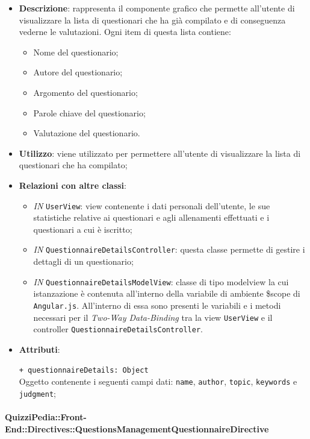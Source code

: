 \begin{itemize}
	\item \textbf{Descrizione}: rappresenta il componente grafico che permette all'utente di visualizzare la lista di questionari che ha già compilato e di conseguenza vederne le valutazioni. Ogni item di questa lista contiene:
	\begin{itemize}
		\item Nome del questionario;
		\item Autore del questionario;
		\item Argomento del questionario;
		\item Parole chiave del questionario;
		\item Valutazione del questionario.
	\end{itemize}
	\item \textbf{Utilizzo}: viene utilizzato per permettere all'utente di visualizzare la lista di questionari che ha compilato;
	\item \textbf{Relazioni con altre classi}: 
	\begin{itemize}
		\item \textit{IN} \texttt{UserView}: view contenente i dati personali dell'utente, le sue statistiche relative ai questionari e agli allenamenti effettuati e i questionari a cui è iscritto;
		\item \textit{IN} \texttt{QuestionnaireDetailsController}: questa classe permette di gestire i dettagli di un questionario;
		\item \textit{IN} \texttt{QuestionnaireDetailsModelView}: classe di tipo modelview la cui istanzazione è contenuta all'interno della variabile di ambiente \$scope di \texttt{Angular.js}. All'interno di essa sono presenti le variabili e i metodi necessari per il \textit{Two-Way Data-Binding} tra la view \texttt{UserView} e il controller \texttt{QuestionnaireDetailsController}.
	\end{itemize}
	\item \textbf{Attributi}: 
	\begin{itemize}
		\texttt{+ questionnaireDetails: Object} \\ Oggetto contenente i seguenti campi dati: \texttt{name}, \texttt{author}, \texttt{topic}, \texttt{keywords} e \texttt{judgment};
	\end{itemize}
\end{itemize}

\paragraph{QuizziPedia::Front-End::Directives::QuestionsManagementQuestionnaireDirective}

